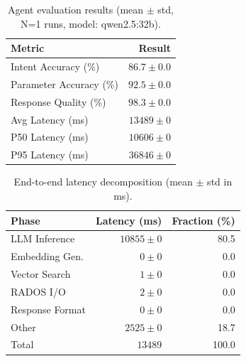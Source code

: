 
\begin{table}[t]
\centering
\caption{Agent evaluation results (mean $\pm$ std, N=1 runs, model: qwen2.5:32b).}
\label{tab:eval-results}
\begin{tabular}{lr}
\toprule
\textbf{Metric} & \textbf{Result} \\
\midrule
Intent Accuracy (\%) & $86.7 \pm 0.0$ \\
Parameter Accuracy (\%) & $92.5 \pm 0.0$ \\
Response Quality (\%) & $98.3 \pm 0.0$ \\
\midrule
Avg Latency (ms) & $13489 \pm 0$ \\
P50 Latency (ms) & $10606 \pm 0$ \\
P95 Latency (ms) & $36846 \pm 0$ \\
\bottomrule
\end{tabular}
\end{table}


\begin{table}[t]
\centering
\caption{End-to-end latency decomposition (mean $\pm$ std in ms).}
\label{tab:latency-decomp}
\begin{tabular}{lrr}
\toprule
\textbf{Phase} & \textbf{Latency (ms)} & \textbf{Fraction (\%)} \\
\midrule
LLM Inference & $10855 \pm 0$ & 80.5 \\
Embedding Gen. & $0 \pm 0$ & 0.0 \\
Vector Search & $1 \pm 0$ & 0.0 \\
RADOS I/O & $2 \pm 0$ & 0.0 \\
Response Format & $0 \pm 0$ & 0.0 \\
Other & $2525 \pm 0$ & 18.7 \\
\midrule
Total & $13489$ & 100.0 \\
\bottomrule
\end{tabular}
\end{table}
